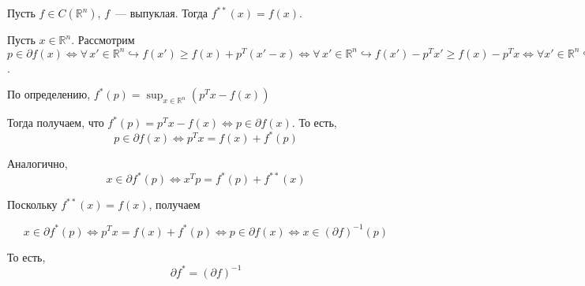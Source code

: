 \documentclass[a4paper]{article}
\begin{document}
Пусть $f\in C(\mathbb{R}^n)$, $f$~--- выпуклая. Тогда $f^{**}(x)=f(x)$.

Пусть $x\in\mathbb{R}^n$. Рассмотрим $p\in\partial f(x)\Leftrightarrow \forall\,x'\in\mathbb{R}^n\hookrightarrow f(x')\geqslant f(x)+p^T(x'-x)\Leftrightarrow \forall\,x'\in\mathbb{R}^n\hookrightarrow f(x')-p^Tx'\geqslant f(x)-p^Tx\Leftrightarrow \forall x'\in\mathbb{R}^n\hookrightarrow p^Tx'-f(x')\leqslant p^Tx-f(x')$.

По определению, $f^*(p)=\sup_{x\in\mathbb{R}^n}(p^Tx-f(x))$

Тогда получаем, что $f^*(p)=p^Tx-f(x)\Leftrightarrow p\in\partial f(x)$. То есть, $$p\in \partial f(x)\Leftrightarrow p^Tx=f(x)+f^*(p)$$

Аналогично, $$x\in\partial f^*(p)\Leftrightarrow x^Tp=f^*(p)+f^{**}(x)$$

Поскольку $f^{**}(x)=f(x)$, получаем

$$x\in\partial f^*(p)\Leftrightarrow p^Tx=f(x)+f^*(p)\Leftrightarrow p\in\partial f(x)\Leftrightarrow x\in (\partial f)^{-1}(p) $$

То есть, $$\partial f^*=(\partial f)^{-1}$$
\end{document}
